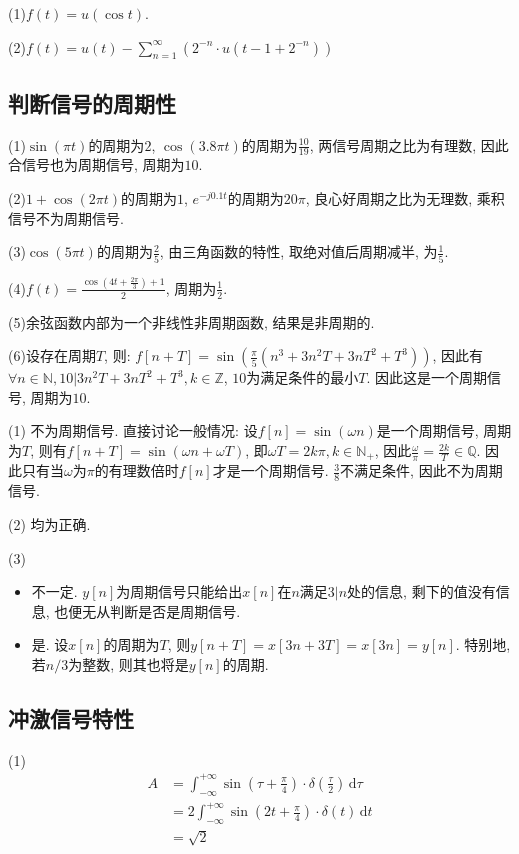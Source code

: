 (1)$f(t)=u(\cos t)$.

(2)$f(t)=u(t)-\sum_{n=1}^{\infty}(2^{-n}\cdot u(t-1+2^{-n}))$

\subsection{判断信号的周期性}


(1)$\sin(\pi t)$的周期为$2$, $\cos(3.8\pi t)$的周期为$\frac{10}{19}$, 两信号周期之比为有理数, 因此合信号也为周期信号, 周期为$10$.

(2)$1+\cos (2\pi t)$的周期为$1$, $e^{-j0.1t}$的周期为$20\pi$, 良心好周期之比为无理数, 乘积信号不为周期信号.

(3)$\cos(5\pi t)$的周期为$\frac{2}{5}$, 由三角函数的特性, 取绝对值后周期减半, 为$\frac{1}{5}$.

(4)$f(t)=\frac{\cos(4t + \frac{2\pi}{3}) + 1}{2}$, 周期为$\frac{1}{2}$.

(5)余弦函数内部为一个非线性非周期函数, 结果是非周期的.

(6)设存在周期$T$, 则: $f[n+T]=\sin(\frac{\pi}{5}(n^3+3n^2T+3nT^2+T^3))$, 因此有$\forall n\in\mathbb{N}, 10|3n^2T+3nT^2+T^3, k\in\mathbb{Z}$, $10$为满足条件的最小$T$. 因此这是一个周期信号, 周期为$10$.

(1) 不为周期信号. 直接讨论一般情况: 设$f[n]=\sin(\omega n)$是一个周期信号, 周期为$T$, 则有$f[n+T]=\sin(\omega n + \omega T)$, 即$\omega T = 2k\pi, k\in\mathbb{N}_+$, 因此$\frac{\omega}{\pi} = \frac{2k}{T} \in \mathbb{Q}$. 因此只有当$\omega$为$\pi$的有理数倍时$f[n]$才是一个周期信号. $\frac{3}{8}$不满足条件, 因此不为周期信号.

(2) 均为正确.

(3)
\begin{itemize}
    \item 不一定. $y[n]$为周期信号只能给出$x[n]$在$n$满足$3|n$处的信息, 剩下的值没有信息, 也便无从判断是否是周期信号.
    \item 是. 设$x[n]$的周期为$T$, 则$y[n+T]=x[3n + 3T]=x[3n]=y[n]$. 特别地, 若$n/3$为整数, 则其也将是$y[n]$的周期.
\end{itemize}

\subsection{冲激信号特性}


(1)
\begin{align*}
    A&=\int_{-\infty}^{+\infty}\sin(\tau + \frac{\pi}{4})\cdot \delta(\frac{\tau}{2})\,\mathrm{d}\tau \\
    &=2\int_{-\infty}^{+\infty}\sin(2t+\frac{\pi}{4})\cdot\delta(t)\,\mathrm{d}t \\
    &=\sqrt{2}
\end{align*}

